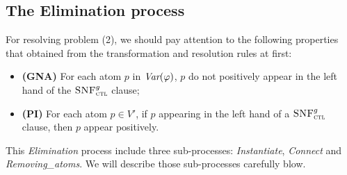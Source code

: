 \documentclass{article}
\begin{document}
\subsection{The Elimination process}
For resolving problem (2), we should pay attention to the following properties that obtained from the transformation and resolution rules at first:
\begin{itemize}
  \item \textbf{(GNA)} For each atom $p$ in $\textit{Var}(\varphi)$, $p$ do not positively appear in the left hand of the ${\textsc{SNF}_{\textsc{ctl}}^g}$ clause;
  \item \textbf{(PI)} For each atom $p\in V'$, if $p$ appearing in the left hand of a ${\textsc{SNF}_{\textsc{ctl}}^g}$ clause, then $p$ appear positively.
\end{itemize}

This \emph{Elimination} process include three sub-processes: \emph{Instantiate}, \emph{Connect} and \emph{Removing\_atoms}. We will describe those sub-processes carefully blow.
\end{document}
